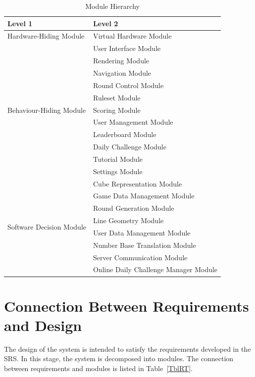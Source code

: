 \documentclass[12pt, titlepage]{article}
\begin{document}
\begin{table}[H]
\centering
\begin{tabular}{p{} p{}}
\toprule
\textbf{Level 1} & \textbf{Level 2}\\
\midrule

Hardware-Hiding Module
& Virtual Hardware Module\\
\midrule

\multirow{11}{0.3\textwidth}{Behaviour-Hiding Module}
& User Interface Module\\
& Rendering Module\\
& Navigation Module\\
& Round Control Module\\
& Ruleset Module\\
& Scoring Module\\
& User Management Module\\
& Leaderboard Module\\
& Daily Challenge Module\\
& Tutorial Module\\
& Settings Module\\
\midrule

\multirow{8}{0.3\textwidth}{Software Decision Module}
& Cube Representation Module\\
& Game Data Management Module\\
& Round Generation Module\\
& Line Geometry Module\\
& User Data Management Module\\
& Number Base Translation Module\\
& Server Communication Module\\
& Online Daily Challenge Manager Module\\
\bottomrule

\end{tabular}
\caption{Module Hierarchy}
\label{TblMH}
\end{table}

\section{Connection Between Requirements and Design} \label{SecConnection}

The design of the system is intended to satisfy the requirements developed in
the SRS. In this stage, the system is decomposed into modules. The connection
between requirements and modules is listed in Table~\ref{TblRT}.
\end{document}
